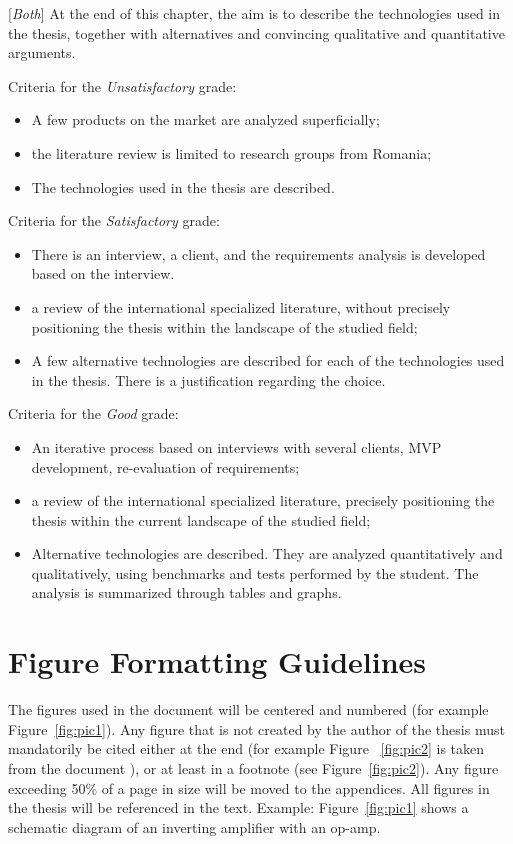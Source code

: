 \documentclass[12pt,a4paper]{report}
\newcommand{\worktype}[1]{[\textit{#1}] }
\newcommand{\dezvoltare}{\worktype{Product development}}
\newcommand{\cercetare}{\worktype{Research}}
\newcommand{\ambele}{\worktype{Both}}
\begin{document}
\ambele At the end of this chapter, the aim is to describe the technologies used in the thesis, together with alternatives and convincing qualitative and quantitative arguments.

Criteria for the \textit{Un\textit{satisfactory}} grade:
\begin{itemize}
	\item \dezvoltare A few products on the market are analyzed superficially;
	\item \cercetare the literature review is limited to research groups from Romania;
	\item \ambele The technologies used in the thesis are described.
\end{itemize}

Criteria for the \textit{Satisfactory} grade:
\begin{itemize}
	\item \dezvoltare There is an interview, a client, and the requirements analysis is developed based on the interview.
	\item \cercetare a review of the international specialized literature, without precisely positioning the thesis within the landscape of the studied field;
	\item \ambele A few alternative technologies are described for each of the technologies used in the thesis. There is a justification regarding the choice.
\end{itemize}

Criteria for the \textit{Good} grade:
\begin{itemize}
	\item \dezvoltare An iterative process based on interviews with several clients, MVP development, re-evaluation of requirements;
	\item \cercetare a review of the international specialized literature, precisely positioning the thesis within the current landscape of the studied field;
	\item \ambele Alternative technologies are described. They are analyzed quantitatively and qualitatively, using benchmarks and tests performed by the student. The analysis is summarized through tables and graphs.
\end{itemize}

\section{Figure Formatting Guidelines}

The figures used in the document will be centered and numbered (for example Figure~\ref{fig:pic1}).
Any figure that is not created by the author of the thesis must mandatorily be cited either at the end (for example Figure ~\ref{fig:pic2} is taken from the document \cite{article}), or at least in a footnote (see Figure~\ref{fig:pic2}). Any figure exceeding 50\% of a page in size will be moved to the appendices. All figures in the thesis will be referenced in the text. Example: Figure~\ref{fig:pic1} shows a schematic diagram of an inverting amplifier with an op-amp.
\end{document}
